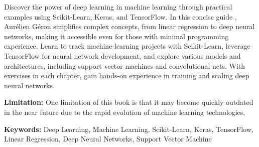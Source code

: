 { 
	Discover the power of deep learning in machine learning through practical examples using Scikit-Learn, Keras, and TensorFlow. In this concise guide \cite{Geron:2022}, Aurélien Géron simplifies complex concepts, from linear regression to deep neural networks, making it accessible even for those with minimal programming experience. Learn to track machine-learning projects with Scikit-Learn, leverage TensorFlow for neural network development, and explore various models and architectures, including support vector machines and convolutional nets. With exercises in each chapter, gain hands-on experience in training and scaling deep neural networks.
	
	\bigskip
	
	\textbf{Limitation:} One limitation of this book is that it may become quickly outdated in the near future due to the rapid evolution of machine learning technologies. 
	
	\scriptsize{\textbf{Keywords:} Deep Learning, Machine Learning, Scikit-Learn, Keras, TensorFlow, Linear Regression, Deep Neural Networks, Support Vector Machine}
}


%	
%	
%	

